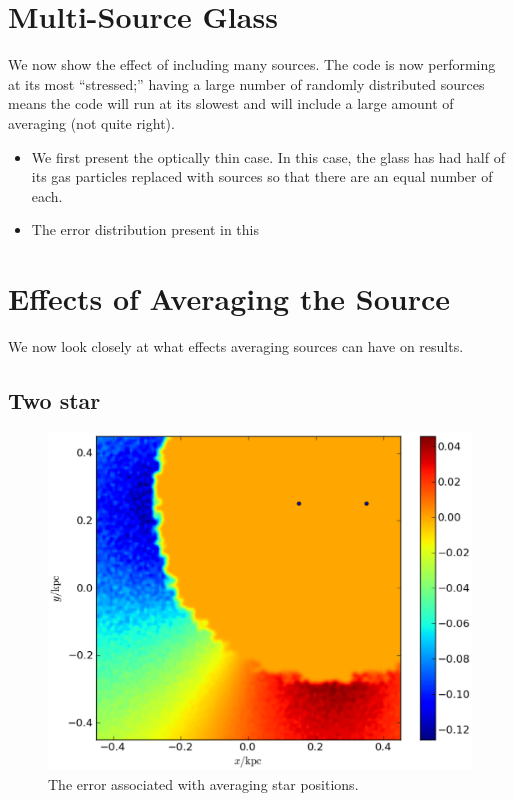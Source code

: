 \section{Multi-Source Glass}
\label{sec:multiglass}

We now show the effect of including many sources. The code is now performing at its most ``stressed;'' having a large number of randomly distributed sources means the code will run at its slowest and will include a large amount of averaging (not quite right).

\begin{itemize}
\item We first present the optically thin case. In this case, the glass has had half of its gas particles replaced with sources so that there are an equal number of each.
\item The error distribution present in this
\end{itemize}

\section{Effects of Averaging the Source}
\label{sec:averagingsource}

We now look closely at what effects averaging sources can have on results.

\subsection{Two star}
\label{sec:twostar}

\begin{figure}
\includegraphics[width=\textwidth]{graphics/errorMap2starthick.eps}
\caption[The error associated with averaging star positions.]{The error associated with averaging star positions.}
\label{fig:twostar}
\end{figure}


